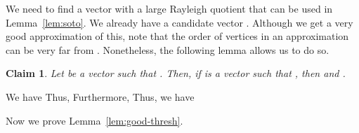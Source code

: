 \documentclass[11pt]{article}
\newtheorem{claim}[theorem]{Claim}
\newenvironment{myproof}{\noindent {\sc Proof:}}{}
\begin{document}
We need to find a vector with a large Rayleigh
quotient that can be used in Lemma~\ref{lem:soto}. We already have a candidate
vector . Although we get a very good approximation of this, note that
the order of vertices in an approximation can be very far from .
Nonetheless, the following lemma allows us to do so.

\begin{claim} \label{clm:close}
Let  be a vector such that . Then,
if  is a vector such that , then
 and .
\end{claim}
\begin{myproof}
We have
 Thus,
 Furthermore,
 Thus, we have

\end{myproof}


Now we prove Lemma~\ref{lem:good-thresh}.
\end{document}
